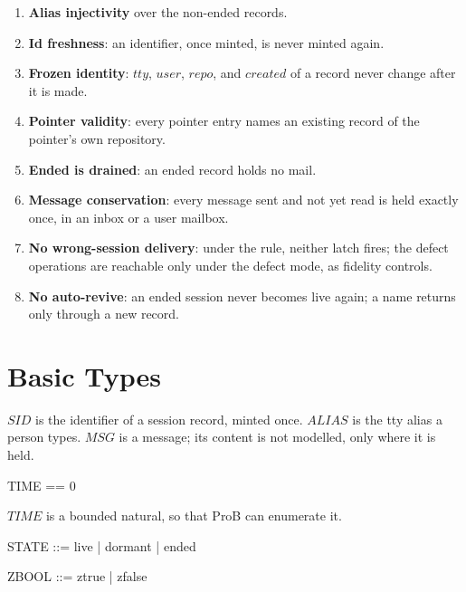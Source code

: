 \documentclass[a4paper,10pt,fleqn]{article}
\begin{document}
\begin{enumerate}
  \item \textbf{Alias injectivity} over the non-ended records.
  \item \textbf{Id freshness}: an identifier, once minted, is never
    minted again.
  \item \textbf{Frozen identity}: $tty$, $user$, $repo$, and $created$
    of a record never change after it is made.
  \item \textbf{Pointer validity}: every pointer entry names an
    existing record of the pointer's own repository.
  \item \textbf{Ended is drained}: an ended record holds no mail.
  \item \textbf{Message conservation}: every message sent and not yet
    read is held exactly once, in an inbox or a user mailbox.
  \item \textbf{No wrong-session delivery}: under the rule, neither
    latch fires; the defect operations are reachable only under the
    defect mode, as fidelity controls.
  \item \textbf{No auto-revive}: an ended session never becomes live
    again; a name returns only through a new record.
\end{enumerate}

\section{Basic Types}

\begin{zed}
\end{zed}

$SID$ is the identifier of a session record, minted once.  $ALIAS$ is
the tty alias a person types.  $MSG$ is a message; its content is not
modelled, only where it is held.

\begin{zed}
  TIME == 0 
\end{zed}

$TIME$ is a bounded natural, so that ProB can enumerate it.

\begin{zed}
  STATE ::= live | dormant | ended
\end{zed}

\begin{zed}
  ZBOOL ::= ztrue | zfalse
\end{zed}
\end{document}
